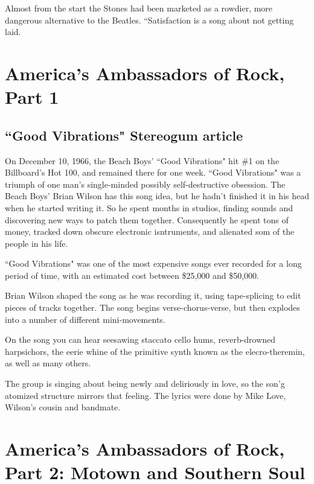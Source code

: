 \documentclass[12pt, a4paper, twoside, openright, titlepage]{book}
\begin{document}
Almost from the start the Stones had been marketed as a rowdier, more dangerous alternative to the Beatles. ``Satisfaction is a song about not getting laid.



\chapter{America's Ambassadors of Rock, Part 1}



\section{``Good Vibrations" Stereogum article}

On December 10, 1966, the Beach Boys' ``Good Vibrations" hit \#1 on the Billboard's Hot 100, and remained there for one week. ``Good Vibrations" was a triumph of one man's single-minded possibly self-destructive obsession. The Beach Boys' Brian Wilson has this song idea, but he hadn't finished it in his head when he started writing it. So he spent months in studios, finding sounds and discovering new ways to patch them together. Consequently he spent tons of money, tracked down obscure electronic isntruments, and alienated som of the people in his life.


``Good Vibrations" was one of the most expensive songs ever recorded for a long period of time, with an estimated cost between \$25,000 and \$50,000.

\begin{note}{}{}
    Brian Wilson shaped the song as he was recording it, using tape-splicing to edit pieces of tracks together. The song begins verse-chorus-verse, but then explodes into a number of different mini-movements.
\end{note}

\begin{rmk}{}{}
    On the song you can hear seesawing staccato cello hums, reverb-drowned harpsichors, the eerie whine of the primitive synth known as the elecro-theremin, as well as many others.
\end{rmk}

The group is singing about being newly and deliriously in love, so the son'g atomized structure mirrors that feeling. The lyrics were done by Mike Love, Wilson's cousin and bandmate.



\chapter{America's Ambassadors of Rock, Part 2: Motown and Southern Soul}
\end{document}
